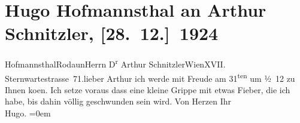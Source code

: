 

         \renewcommand{\erwaehnteOrte}{Orte: Rodaun, Sternwartestraße, Wien}
         \renewcommand{\erwaehnteWerke}{}
               \section[Hugo Hofmannsthal an Arthur Schnitzler, {[}28. 12.{]} 1924]{ Hugo Hofmannsthal an Arthur Schnitzler, {[}28. 12.{]} 1924}\nopagebreak{}\rehead{ }\begin{ledgroupsized}[t]{13cm}\normalsize\beginnumbering \toendnotes[C]{\smallbreak\pagebreak[2]} 
\pstart{}{\pb}Hofmannsthal\pend{}\pstart{}Rodaun\pend{}{\bigskip}\pstart{}Herrn D\textsuperscript{r} Arthur Schnitzler\pend{}\pstart{}Wien\pend{}\pstart{}XVII. Sternwartestrasse 71.\pend{}{\bigskip}\pstart{}{\pb}lieber Arthur\pend\pstart
           ich werde mit Freude am 31\textsuperscript{ten} um ½ 12 zu Ihnen ko{\geminationm}en. Ich setze
               voraus dass {\pb}eine kleine Grippe
               mit etwas Fieber, die ich habe, bis dahin völlig geschwunden sein wird.\pend
           \pstart
           Von Herzen Ihr{\\[\baselineskip]}\spacefill\mbox{Hugo.}\pend
           \leftskip=0em{}
         
         \endnumbering{}\end{ledgroupsized}  \newcommand{\dateiname}{L02427}\newcommand{\titel}{Hugo Hofmannsthal an Arthur Schnitzler, [28. 12.] 1924}\newcommand{\editorInnen}{Martin Anton Müller und Gerd-Hermann Susen}
      